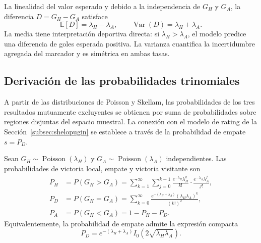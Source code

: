 \begin{obs}
	\label{obs:momentos_skellam}
	La linealidad del valor esperado y debido a la independencia de $G_H$ y $G_A$, la diferencia $D = G_H - G_A$ satisface
	\begin{equation}\label{eq:momentos_skellam}
		\mathbb{E}[D] = \lambda_H - \lambda_A, \qquad
		\operatorname{Var}(D) = \lambda_H + \lambda_A.
	\end{equation}
	La media tiene interpretaci\'on deportiva directa: si $\lambda_H > \lambda_A$, el modelo predice una diferencia de goles esperada positiva. La varianza cuantifica la incertidumbre agregada del marcador y es sim\'etrica en ambas tasas.
\end{obs}


\subsection{Derivaci\'on de las probabilidades trinomiales}
\label{subsec:prob_tres_resultados}

A partir de las distribuciones de Poisson y Skellam, las probabilidades de los tres resultados mutuamente excluyentes se obtienen por suma de probabilidades sobre regiones disjuntas del espacio muestral. La conexi\'on con el modelo de rating de la Secci\'on~\ref{subsec:shelopugin} se establece a trav\'es de la probabilidad de empate $s = P_D$.

\begin{prop}\label{prop:prob_resultados}
	Sean $G_H \sim \operatorname{Poisson}(\lambda_H)$ y $G_A \sim \operatorname{Poisson}(\lambda_A)$ independientes. Las probabilidades de victoria local, empate y victoria visitante son
	\begin{align}
		P_H &= P(G_H > G_A) = \sum_{k=1}^{\infty} \sum_{j=0}^{k-1} \frac{e^{-\lambda_H} \lambda_H^{k}}{k!} \cdot \frac{e^{-\lambda_A} \lambda_A^{j}}{j!}, \label{eq:prob_H} \\
		P_D &= P(G_H = G_A) = \sum_{k=0}^{\infty} \frac{e^{-(\lambda_H + \lambda_A)} (\lambda_H \lambda_A)^{k}}{(k!)^{2}}, \label{eq:prob_D} \\
		P_A &= P(G_H < G_A) = 1 - P_H - P_D. \label{eq:prob_A}
	\end{align}
	Equivalentemente, la probabilidad de empate admite la expresi\'on compacta
	\begin{equation}\label{eq:prob_D_bessel}
		P_D = e^{-(\lambda_H + \lambda_A)} I_0\!\left(2\sqrt{\lambda_H \lambda_A}\right).
	\end{equation}
\end{prop}


